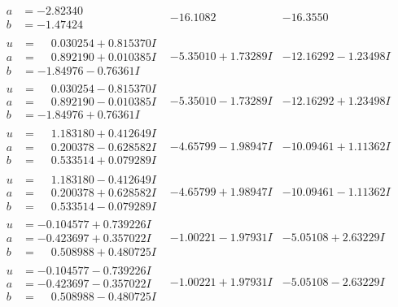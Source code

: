 \documentclass[1p]{elsarticle_modified}
\theoremstyle{definition}
\begin{document}
$$\begin{array}{c|c|c}
\begin{aligned}
a &= -2.82340\phantom{ +0.000000I} \\
b &= -1.47424\phantom{ +0.000000I}\end{aligned}
 & -16.1082\phantom{ +0.000000I} & -16.3550\phantom{ +0.000000I} \\ \hline\begin{aligned}
u &= \phantom{-}0.030254 + 0.815370 I \\
a &= \phantom{-}0.892190 + 0.010385 I \\
b &= -1.84976 - 0.76361 I\end{aligned}
 & -5.35010 + 1.73289 I & -12.16292 - 1.23498 I \\ \hline\begin{aligned}
u &= \phantom{-}0.030254 - 0.815370 I \\
a &= \phantom{-}0.892190 - 0.010385 I \\
b &= -1.84976 + 0.76361 I\end{aligned}
 & -5.35010 - 1.73289 I & -12.16292 + 1.23498 I \\ \hline\begin{aligned}
u &= \phantom{-}1.183180 + 0.412649 I \\
a &= \phantom{-}0.200378 - 0.628582 I \\
b &= \phantom{-}0.533514 + 0.079289 I\end{aligned}
 & -4.65799 - 1.98947 I & -10.09461 + 1.11362 I \\ \hline\begin{aligned}
u &= \phantom{-}1.183180 - 0.412649 I \\
a &= \phantom{-}0.200378 + 0.628582 I \\
b &= \phantom{-}0.533514 - 0.079289 I\end{aligned}
 & -4.65799 + 1.98947 I & -10.09461 - 1.11362 I \\ \hline\begin{aligned}
u &= -0.104577 + 0.739226 I \\
a &= -0.423697 + 0.357022 I \\
b &= \phantom{-}0.508988 + 0.480725 I\end{aligned}
 & -1.00221 - 1.97931 I & -5.05108 + 2.63229 I \\ \hline\begin{aligned}
u &= -0.104577 - 0.739226 I \\
a &= -0.423697 - 0.357022 I \\
b &= \phantom{-}0.508988 - 0.480725 I\end{aligned}
 & -1.00221 + 1.97931 I & -5.05108 - 2.63229 I \\ \hline\begin{aligned}

\end{aligned}
\end{array}$$
\end{document}
